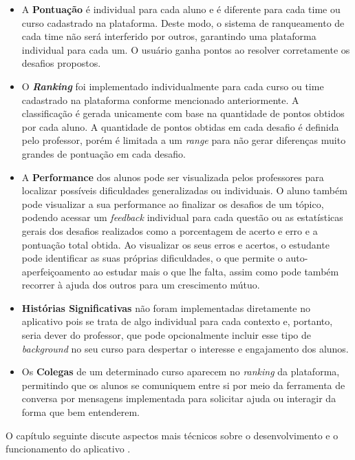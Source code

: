 \begin{itemize}
    \item A \textbf{Pontuação} é individual para cada aluno e é diferente para cada time ou curso cadastrado na plataforma. Deste modo, o sistema de ranqueamento de cada time não será interferido por outros, garantindo uma plataforma individual para cada um. O usuário ganha pontos ao resolver corretamente os desafios propostos.
    \item O \textbf{\textit{Ranking}} foi implementado individualmente para cada curso ou time cadastrado na plataforma conforme mencionado anteriormente. A classificação é gerada unicamente com base na quantidade de pontos obtidos por cada aluno. A quantidade de pontos obtidas em cada desafio é definida pelo professor, porém é limitada a um \textit{range} para não gerar diferenças muito grandes de pontuação em cada desafio.
    \item A \textbf{Performance} dos alunos pode ser visualizada pelos professores para localizar possíveis dificuldades generalizadas ou individuais. O aluno também pode visualizar a sua performance ao finalizar os desafios de um tópico, podendo acessar um \textit{feedback} individual para cada questão ou as estatísticas gerais dos desafios realizados como a porcentagem de acerto e erro e a pontuação total obtida. Ao visualizar os seus erros e acertos, o estudante pode identificar as suas próprias dificuldades, o que permite o auto-aperfeiçoamento ao estudar mais o que lhe falta, assim como pode também recorrer à ajuda dos outros para um crescimento mútuo.
    \item \textbf{Histórias Significativas} não foram implementadas diretamente no aplicativo pois se trata de algo individual para cada contexto e, portanto, seria dever do professor, que pode opcionalmente incluir esse tipo de \textit{background} no seu curso para despertar o interesse e engajamento dos alunos.
    \item Os \textbf{Colegas} de um determinado curso aparecem no \textit{ranking} da plataforma, permitindo que os alunos se comuniquem entre si por meio da ferramenta de conversa por mensagens implementada para solicitar ajuda ou interagir da forma que bem entenderem.
\end{itemize}

O capítulo seguinte discute aspectos mais técnicos sobre o desenvolvimento e o funcionamento do aplicativo \appName.
